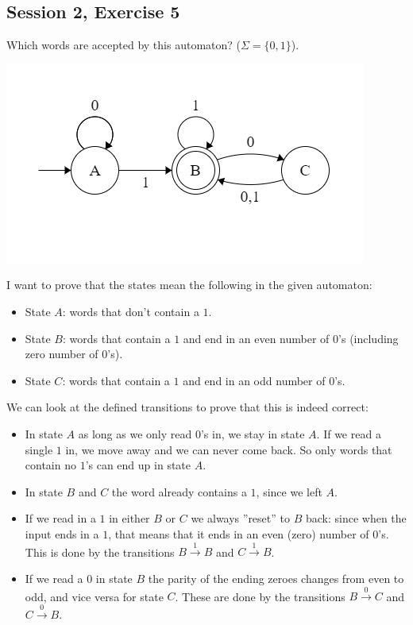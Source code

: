 \subsection{Session 2, Exercise 5}


Which words are accepted by this automaton? ($\Sigma=\{0,1\}$).

\includegraphics[width=0.5\linewidth]{02/2_5_automaton.png}


I want to prove that the states mean the following in the given automaton:

\begin{itemize}
    \item State $A$: words that don't contain a $1$.
    \item State $B$: words that contain a $1$ and end in an even number of $0$'s (including zero number of $0$'s).
    \item State $C$: words that contain a $1$ and end in an odd number of $0$'s.
\end{itemize}

We can look at the defined transitions to prove that this is indeed correct:

\begin{itemize}
    \item In state $A$ as long as we only read $0$'s in, we stay in state $A$. If we read a single $1$ in, we move away and we can never come back. So only words that contain no $1$'s can end up in state $A$.
    \item In state $B$ and $C$ the word already contains a $1$, since we left $A$.
    \item If we read in a $1$ in either $B$ or $C$ we always ''reset'' to $B$ back: since when the input ends in a $1$, that means that it ends in an even (zero) number of $0$'s. This is done by the transitions $B\xrightarrow{1}B$ and $C\xrightarrow{1}B$.
    \item If we read a $0$ in state $B$ the parity of the ending zeroes changes from even to odd, and vice versa for state $C$. These are done by the transitions $B\xrightarrow{0}C$ and $C\xrightarrow{0}B$.
\end{itemize}

